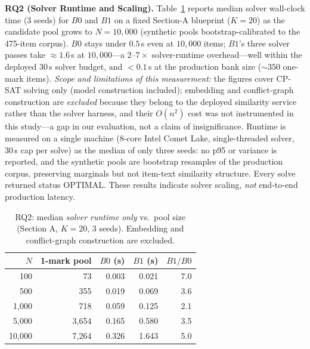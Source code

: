 \documentclass[runningheads]{llncs}
\begin{document}
\noindent\textbf{RQ2 (Solver Runtime and Scaling).} Table~\ref{tab:rq2} reports median solver wall-clock time (3 seeds) for $B0$ and $B1$ on a fixed Section-A blueprint ($K{=}20$) as the candidate pool grows to $N{=}10{,}000$ (synthetic pools bootstrap-calibrated to the 475-item corpus).
$B0$ stays under $0.5$\,s even at $10{,}000$ items; $B1$'s three solver passes take $\approx1.6$\,s at $10{,}000$---a $2$--$7\times$ solver-runtime overhead---well within the deployed 30\,s solver budget, and $<0.1$\,s at the production bank size ($\sim350$ one-mark items).
\emph{Scope and limitations of this measurement:} the figures cover CP-SAT solving only (model construction included);
embedding and conflict-graph construction are \emph{excluded} because they belong to the deployed similarity service rather than the solver harness, and their $O(n^2)$ cost was not instrumented in this study---a gap in our evaluation, not a claim of insignificance.
Runtime is measured on a single machine (8-core Intel Comet Lake, single-threaded solver, 30\,s cap per solve) as the median of only three seeds: no p95 or variance is reported, and the synthetic pools are bootstrap resamples of the production corpus, preserving marginals but not item-text similarity structure.
Every solve returned status OPTIMAL. These results indicate solver scaling, \emph{not} end-to-end production latency.

\begin{table}[t]
\caption{RQ2: median \emph{solver runtime only} vs.\ pool size (Section A, $K{=}20$, 3 seeds). Embedding and conflict-graph construction are excluded.}
\label{tab:rq2}
\centering
\small
\begin{tabular}{rrrrr}
\toprule
$N$ & 1-mark pool & $B0$ (s) & $B1$ (s) & $B1/B0$ \\
\midrule
100 & 73 & 0.003 & 0.021 & 7.0 \\
500 & 355 & 0.019 & 0.069 & 3.6 \\
1,000 & 718 & 0.059 & 0.125 & 2.1 \\
5,000 & 3,654 & 0.165 & 0.580 & 3.5 \\
10,000 & 7,264 & 0.326 & 1.643 & 5.0 \\
\bottomrule
\end{tabular}
\end{table}
\end{document}
